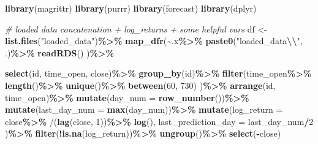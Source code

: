 \documentclass[
]{article}
\newenvironment{Shaded}{\begin{snugshade}}{\end{snugshade}}
\newcommand{\AttributeTok}[1]{\textcolor[rgb]{0.13,0.29,0.53}{#1}}
\newcommand{\CommentTok}[1]{\textcolor[rgb]{0.56,0.35,0.01}{\textit{#1}}}
\newcommand{\DecValTok}[1]{\textcolor[rgb]{0.00,0.00,0.81}{#1}}
\newcommand{\FunctionTok}[1]{\textcolor[rgb]{0.13,0.29,0.53}{\textbf{#1}}}
\newcommand{\NormalTok}[1]{#1}
\newcommand{\OtherTok}[1]{\textcolor[rgb]{0.56,0.35,0.01}{#1}}
\newcommand{\SpecialCharTok}[1]{\textcolor[rgb]{0.81,0.36,0.00}{\textbf{#1}}}
\newcommand{\StringTok}[1]{\textcolor[rgb]{0.31,0.60,0.02}{#1}}
\begin{document}
\begin{Shaded}
\begin{Highlighting}[]
\FunctionTok{library}\NormalTok{(magrittr)}
\FunctionTok{library}\NormalTok{(purrr)}
\FunctionTok{library}\NormalTok{(forecast)}
\FunctionTok{library}\NormalTok{(dplyr)}

\CommentTok{\# loaded data concatenation + log\_returns + some helpful vars}
\NormalTok{df }\OtherTok{\textless{}{-}} 
  \FunctionTok{list.files}\NormalTok{(}\StringTok{"loaded\_data"}\NormalTok{)}\SpecialCharTok{\%\textgreater{}\%}
    \FunctionTok{map\_dfr}\NormalTok{(}\SpecialCharTok{\textasciitilde{}}\NormalTok{.x}\SpecialCharTok{\%\textgreater{}\%}
              \FunctionTok{paste0}\NormalTok{(}\StringTok{"loaded\_data}\SpecialCharTok{\textbackslash{}\textbackslash{}}\StringTok{"}\NormalTok{, .)}\SpecialCharTok{\%\textgreater{}\%}
              \FunctionTok{readRDS}\NormalTok{()}
\NormalTok{    )}\SpecialCharTok{\%\textgreater{}\%}
  
  \FunctionTok{select}\NormalTok{(id, time\_open, close)}\SpecialCharTok{\%\textgreater{}\%}
  \FunctionTok{group\_by}\NormalTok{(id)}\SpecialCharTok{\%\textgreater{}\%}
  \FunctionTok{filter}\NormalTok{(time\_open}\SpecialCharTok{\%\textgreater{}\%}
          \FunctionTok{length}\NormalTok{()}\SpecialCharTok{\%\textgreater{}\%}
          \FunctionTok{unique}\NormalTok{()}\SpecialCharTok{\%\textgreater{}\%}
          \FunctionTok{between}\NormalTok{(}\DecValTok{60}\NormalTok{, }\DecValTok{730}\NormalTok{)}
\NormalTok{  )}\SpecialCharTok{\%\textgreater{}\%}
  \FunctionTok{arrange}\NormalTok{(id, time\_open)}\SpecialCharTok{\%\textgreater{}\%}
  \FunctionTok{mutate}\NormalTok{(}\AttributeTok{day\_num =} \FunctionTok{row\_number}\NormalTok{())}\SpecialCharTok{\%\textgreater{}\%}
  \FunctionTok{mutate}\NormalTok{(}\AttributeTok{last\_day\_num =} \FunctionTok{max}\NormalTok{(day\_num))}\SpecialCharTok{\%\textgreater{}\%}
  \FunctionTok{mutate}\NormalTok{(}\AttributeTok{log\_return =}\NormalTok{ close}\SpecialCharTok{\%\textgreater{}\%}
                        \StringTok{\textasciigrave{}}\AttributeTok{/}\StringTok{\textasciigrave{}}\NormalTok{(}\FunctionTok{lag}\NormalTok{(close, }\DecValTok{1}\NormalTok{))}\SpecialCharTok{\%\textgreater{}\%} 
                        \FunctionTok{log}\NormalTok{(),}
         \AttributeTok{last\_prediction\_day =}\NormalTok{ last\_day\_num}\SpecialCharTok{/}\DecValTok{2}
\NormalTok{  )}\SpecialCharTok{\%\textgreater{}\%}
  \FunctionTok{filter}\NormalTok{(}\SpecialCharTok{!}\FunctionTok{is.na}\NormalTok{(log\_return))}\SpecialCharTok{\%\textgreater{}\%}
  \FunctionTok{ungroup}\NormalTok{()}\SpecialCharTok{\%\textgreater{}\%}
  \FunctionTok{select}\NormalTok{(}\SpecialCharTok{{-}}\NormalTok{close)}
\end{Highlighting}
\end{Shaded}
\end{document}

